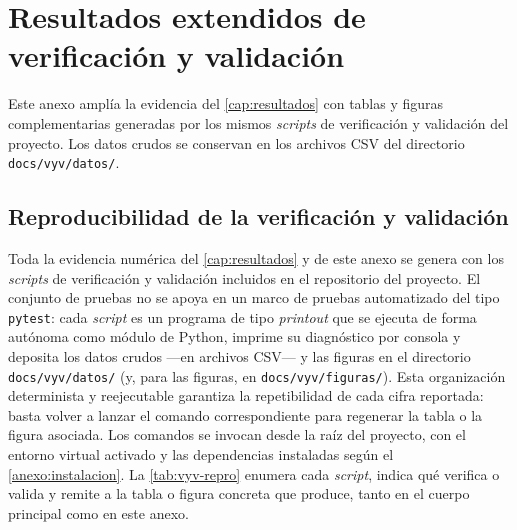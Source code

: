 \chapter{Resultados extendidos de verificación y validación}
\label{anexo:vyv}

Este anexo amplía la evidencia del \autoref{cap:resultados} con tablas y figuras complementarias generadas por los mismos \emph{scripts} de verificación y validación del proyecto. Los datos crudos se conservan en los archivos CSV del directorio \texttt{docs/vyv/datos/}.

\section{Reproducibilidad de la verificación y validación}
\label{sec:vyv-reproducibilidad}

Toda la evidencia numérica del \autoref{cap:resultados} y de este anexo se genera con los \emph{scripts} de verificación y validación incluidos en el repositorio del proyecto. El conjunto de pruebas no se apoya en un marco de pruebas automatizado del tipo \texttt{pytest}: cada \emph{script} es un programa de tipo \emph{printout} que se ejecuta de forma autónoma como módulo de Python, imprime su diagnóstico por consola y deposita los datos crudos ---en archivos CSV--- y las figuras en el directorio \texttt{docs/vyv/datos/} (y, para las figuras, en \texttt{docs/vyv/figuras/}). Esta organización determinista y reejecutable garantiza la repetibilidad de cada cifra reportada: basta volver a lanzar el comando correspondiente para regenerar la tabla o la figura asociada. Los comandos se invocan desde la raíz del proyecto, con el entorno virtual activado y las dependencias instaladas según el \autoref{anexo:instalacion}. La \autoref{tab:vyv-repro} enumera cada \emph{script}, indica qué verifica o valida y remite a la tabla o figura concreta que produce, tanto en el cuerpo principal como en este anexo.

